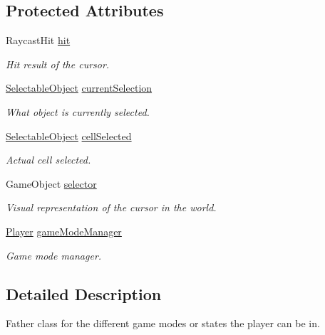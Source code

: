 \subsection*{Protected Attributes}
\begin{DoxyCompactItemize}
\item 
Raycast\+Hit \mbox{\hyperlink{class_game_mode_a5ad1c251d03a0407d064fd581b1119b5}{hit}}
\begin{DoxyCompactList}\small\item\em Hit result of the cursor. \end{DoxyCompactList}\item 
\mbox{\hyperlink{class_selectable_object}{Selectable\+Object}} \mbox{\hyperlink{class_game_mode_ae7e1e703236e093aeb97038045c1c2a3}{current\+Selection}}
\begin{DoxyCompactList}\small\item\em What object is currently selected. \end{DoxyCompactList}\item 
\mbox{\hyperlink{class_selectable_object}{Selectable\+Object}} \mbox{\hyperlink{class_game_mode_aada21e937be16ab599f8f7501e23c8c4}{cell\+Selected}}
\begin{DoxyCompactList}\small\item\em Actual cell selected. \end{DoxyCompactList}\item 
Game\+Object \mbox{\hyperlink{class_game_mode_a01e79f1e24fe9681e06b53d81eb81293}{selector}}
\begin{DoxyCompactList}\small\item\em Visual representation of the cursor in the world. \end{DoxyCompactList}\item 
\mbox{\hyperlink{class_player}{Player}} \mbox{\hyperlink{class_game_mode_a5a2348927e4b11e88abaf1d2328eed60}{game\+Mode\+Manager}}
\begin{DoxyCompactList}\small\item\em Game mode manager. \end{DoxyCompactList}\end{DoxyCompactItemize}


\subsection{Detailed Description}
Father class for the different game modes or states the player can be in. 



